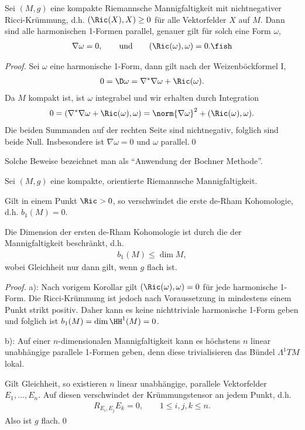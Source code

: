\documentclass[%
	paper=a5,%
	fleqn,%
	DIV=18,%
	BCOR=0mm,
	fontsize=11pt,
	titlepage=false,%
	bibliography=totoc,
	DIV=18,%
	twoside=true,
	pdftitle=Riemannsche Geometrie,
	pdfauthor=Uwe Semmelmann,
	numbers=noendperiod]%
	{scrbook}
\begin{document}
\begin{cor}
Sei $(M,g)$ eine kompakte Riemannsche Mannigfaltigkeit mit nichtnegativer Ricci-Krümmung, d.h.
$(\Ric(X),X) \ge 0$ für alle Vektorfelder $X$ auf $M$. Dann sind alle harmonischen 1-Formen parallel, genauer gilt für solch eine Form $\omega$,
\begin{align*}
\nabla\omega = 0,\qquad \text{und}\qquad (\Ric(\omega),\omega) = 0.\fish
\end{align*}
\end{cor}
\begin{proof}
Sei $\omega$ eine harmonische 1-Form, dann gilt nach der Weizenböckformel I,
\begin{align*}
0 = \D \omega = \nabla^*\nabla\omega + \Ric(\omega).
\end{align*}
Da $M$ kompakt ist, ist $\omega$ integrabel und wir erhalten durch Integration
\begin{align*}
0 = (\nabla^*\nabla\omega + \Ric(\omega),\omega) = 
\norm{\nabla\omega}^2 + (\Ric(\omega),\omega).
\end{align*}
Die beiden Summanden auf der rechten Seite sind nichtnegativ, folglich sind beide Null. Insbesondere ist $\nabla\omega = 0$ und  $\omega$ parallel.\qed
\end{proof}

\begin{rem}
Solche Beweise bezeichnet man als ``Anwendung der Bochner Methode''.\map
\end{rem}

\begin{cor}
Sei $(M,g)$ eine kompakte, orientierte Riemannsche Mannigfaltigkeit.
\begin{propenum}
\item Gilt in einem Punkt $\Ric > 0$, so verschwindet die erste de-Rham Kohomologie, d.h. $b_{1}(M) = 0$.
\item Die Dimension der ersten de-Rham Kohomologie ist durch die der Mannigfaltigkeit beschränkt, d.h.
\begin{align*}
b_{1}(M) \le \dim M,
\end{align*}
wobei Gleichheit nur dann gilt, wenn $g$ flach ist.\fish
\end{propenum}
\end{cor}

\begin{proof}
a): Nach vorigem Korollar gilt $(\Ric(\omega),\omega) = 0$ für jede harmonische 1-Form. Die Ricci-Krümmung ist jedoch nach Voraussetzung in mindestens einem Punkt strikt positiv. Daher kann es keine nichttriviale harmonische 1-Form geben und folglich  ist $b_{1}(M) = \dim \HH^1(M) = 0$.

b): Auf einer $n$-dimensionalen Mannigfaltigkeit kann es höchstens $n$ linear unabhängige parallele 1-Formen geben, denn diese trivialisieren das Bündel $\Lambda^1TM$ lokal.

Gilt Gleichheit, so existieren $n$ linear unabhängige, parallele Vektorfelder $E_{1},\ldots,E_{n}$. Auf diesen verschwindet der Krümmungstensor an jedem Punkt, d.h.
\begin{align*}
R_{E_{i},E_{j}}E_{k} = 0,\qquad 1\le i,j,k\le n.
\end{align*}
Also ist $g$ flach.\qed
\end{proof}
\end{document}
